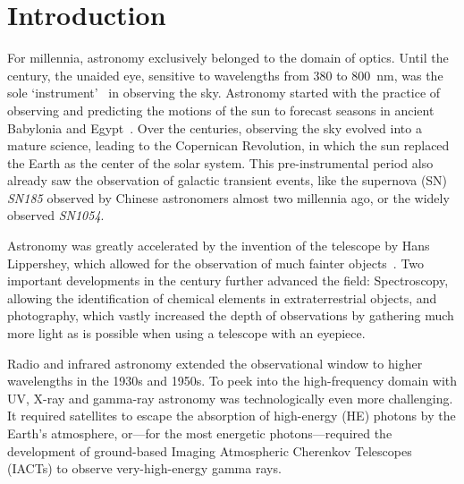 \chapter*{Introduction}\label{introduction}

For millennia, astronomy exclusively belonged to the domain of optics. Until the  century, the unaided eye, sensitive to wavelengths from \num{380} to \SI{800}{\nano\m}, was the sole `instrument'~ in observing the sky. Astronomy started with the practice of observing and predicting the motions of the sun to forecast seasons in ancient Babylonia and Egypt~. Over the centuries, observing the sky evolved into a mature science, leading to the Copernican Revolution, in which the sun replaced the Earth as the center of the solar system. This pre-instrumental period also already saw the observation of galactic transient events, like the supernova (SN) \emph{SN185} observed by Chinese astronomers almost two millennia ago, or the widely observed \emph{SN1054}.

Astronomy was greatly accelerated by the invention of the telescope by Hans Lippershey, which allowed for the observation of much fainter objects~. Two important developments in the  century further advanced the field: Spectroscopy, allowing the identification of chemical elements in extraterrestrial objects, and photography, which vastly increased the depth of observations by gathering much more light as is possible when using a telescope with an eyepiece.

Radio and infrared astronomy extended the observational window to higher wavelengths in the 1930s and 1950s. To peek into the high-frequency domain with UV, X-ray and gamma-ray astronomy was technologically even more challenging. It required satellites to escape the absorption of high-energy (HE) photons by the Earth's atmosphere, or---for the most energetic photons---required the development of ground-based Imaging Atmospheric Cherenkov Telescopes (IACTs) to observe very-high-energy gamma rays.

